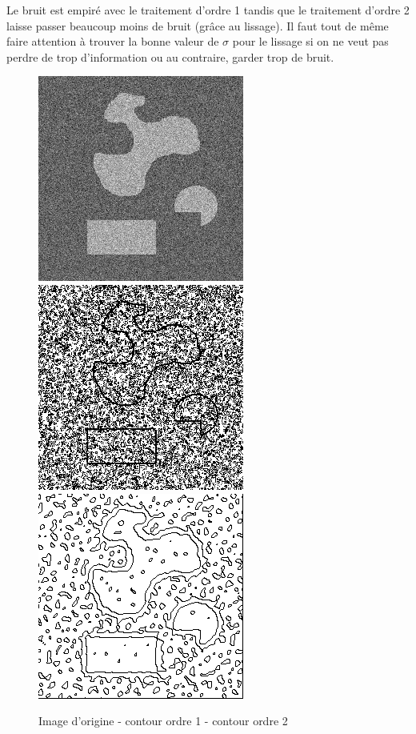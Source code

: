 \documentclass[paper=a4, fontsize=11pt]{scrartcl} %
\begin{document}
Le bruit est empiré avec le traitement d'ordre 1 tandis que le traitement d'ordre 2 laisse passer beaucoup moins de bruit (grâce au lissage). Il faut tout de même faire attention à trouver la bonne valeur de $\sigma$ pour le lissage si on ne veut pas perdre de trop d'information ou au contraire, garder trop de bruit.
\begin{figure}
\centering
\caption{Image d'origine - contour ordre 1 - contour ordre 2}
\label{bruitcom}
\includegraphics[scale=0.5]{images/rapport/formes2bb25.png} 
\includegraphics[scale=0.5]{images/rapport/coucoubruit.png}
\includegraphics[scale=0.5]{images/rapport/coucoubruit2.png} 
\end{figure}
 
\end{document}
